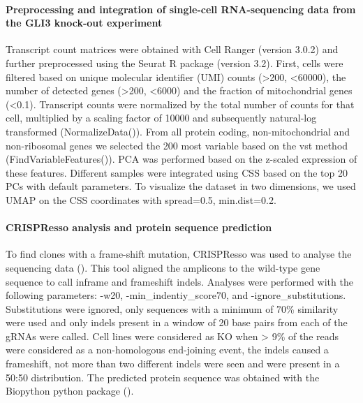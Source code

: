  
\paragraph{Preprocessing and integration of single-cell RNA-sequencing data from the GLI3 knock-out experiment}
Transcript count matrices were obtained with Cell Ranger (version 3.0.2) and further preprocessed using the Seurat R package (version 3.2). First, cells were filtered based on unique molecular identifier (UMI) counts (>200, <60000), the number of detected genes (>200, <6000) and the fraction of mitochondrial genes (<0.1). Transcript counts were normalized by the total number of counts for that cell, multiplied by a scaling factor of 10000 and subsequently natural-log transformed (NormalizeData()). From all protein coding, non-mitochondrial and non-ribosomal genes we selected the 200 most variable based on the vst method (FindVariableFeatures()).  PCA was performed based on the z-scaled expression of these features. Different samples were integrated using CSS based on the top 20 PCs with default parameters. To visualize the dataset in two dimensions, we used  UMAP on the CSS coordinates with spread=0.5, min.dist=0.2.
 
\paragraph{CRISPResso analysis and protein sequence prediction}
To find clones with a frame-shift mutation, CRISPResso was used to analyse the sequencing data (\cite{pinello_analyzing_2016}). This tool aligned the amplicons to the wild-type gene sequence to call inframe and frameshift indels. Analyses were performed with the following parameters: -w20, -min\_indentiy\_score70, and -ignore\_substitutions. Substitutions were ignored, only sequences with a minimum of 70\% similarity were used and only indels present in a window of 20 base pairs from each of the gRNAs were called. Cell lines were considered as KO when > 9\% of the reads were considered as a non-homologous end-joining event, the indels caused a frameshift, not more than two different indels were seen and were present in a 50:50 distribution. The predicted protein sequence was obtained with the Biopython python package (\cite{cock_biopython_2009}).
 
